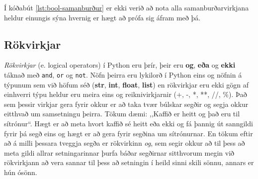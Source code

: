 Í kóðabút \ref{lst:bool-samanburður} er ekki verið að nota alla samanburðarvirkjana heldur einungis sýna hvernig er hægt að prófa sig áfram með þá.

\subsection{Rökvirkjar}
\textit{Rökvirkjar} (e. logical operators) í Python eru þrír, þeir eru \textbf{og}, \textbf{eða}  og \textbf{ekki} táknað með \texttt{and}, \texttt{or} og \texttt{not}.
Nöfn þeirra eru lykilorð í Python eins og nöfnin á týpunum sem við höfum séð (\textbf{str}, \textbf{int}, \textbf{float}, \textbf{list}) en rökvirkjar eru ekki gögn af einhverri týpu heldur eru meira eins og reiknivirkjarnir (+, -, *, **, //, \%).
Það sem þessir virkjar gera fyrir okkur er að taka tvær búlskar segðir og segja okkur eitthvað um samsetningu þeirra.
Tökum dæmi: ,,Kaffið er heitt og það eru til sítrónur“.
Hægt er að meta hvort kaffið sé heitt eða ekki og fá þannig út sanngildi fyrir þá segð eins og hægt er að gera fyrir segðina um sítrónurnar.
En tökum eftir að á milli þessara tveggja segða er rökvirkinn \textit{og}, sem segir okkur að til þess að meta gildi allrar setningarinnar þurfa báðar segðirnar sitthvorum megin við rökvirkjann að vera sannar til þess að setningin í heild sinni skili sönnu, annars er hún ósönn.
\vspace{10pt}
